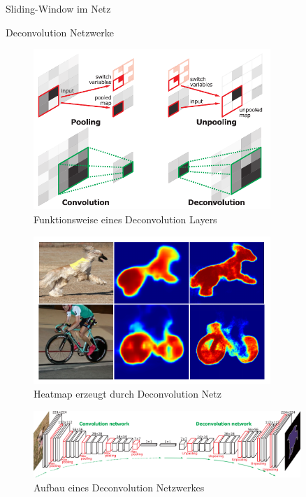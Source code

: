 \begin{frame}{Sliding-Window im Netz}

\end{frame}

\begin{frame}{Deconvolution Netzwerke}

\begin{minipage}[b]{0.49\textwidth}
\begin{figure}[H]
	\centering
	\includegraphics[width=0.8\textwidth]{../images/deconv.png}
	\caption*{\scriptsize{Funktionsweise eines Deconvolution Layers}}
\end{figure}
\end{minipage}
\begin{minipage}[b]{0.49\textwidth}
\begin{figure}[H]
	\centering
	\includegraphics[width=0.8\textwidth]{../images/heatmap.png}
	\caption*{\scriptsize{Heatmap erzeugt durch Deconvolution Netz}}
\end{figure}
\end{minipage}

\begin{figure}[H]
	\centering
	\includegraphics[width=0.9\textwidth]{../images/overall.png}
    \caption*{\scriptsize{Aufbau eines Deconvolution Netzwerkes}}
\end{figure}






\end{frame}